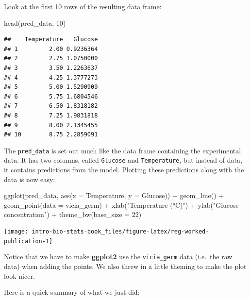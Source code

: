 \documentclass[
]{book}
\newenvironment{Shaded}{\begin{snugshade}}{\end{snugshade}}
\newcommand{\AttributeTok}[1]{\textcolor[rgb]{0.77,0.63,0.00}{#1}}
\newcommand{\DecValTok}[1]{\textcolor[rgb]{0.00,0.00,0.81}{#1}}
\newcommand{\FunctionTok}[1]{\textcolor[rgb]{0.00,0.00,0.00}{#1}}
\newcommand{\NormalTok}[1]{#1}
\newcommand{\SpecialCharTok}[1]{\textcolor[rgb]{0.00,0.00,0.00}{#1}}
\newcommand{\StringTok}[1]{\textcolor[rgb]{0.31,0.60,0.02}{#1}}
\begin{document}
Look at the first 10 rows of the resulting data frame:

\begin{Shaded}
\begin{Highlighting}[]
\FunctionTok{head}\NormalTok{(pred\_data, }\DecValTok{10}\NormalTok{)}
\end{Highlighting}
\end{Shaded}

\begin{verbatim}
##    Temperature   Glucose
## 1         2.00 0.9236364
## 2         2.75 1.0750000
## 3         3.50 1.2263637
## 4         4.25 1.3777273
## 5         5.00 1.5290909
## 6         5.75 1.6804546
## 7         6.50 1.8318182
## 8         7.25 1.9831818
## 9         8.00 2.1345455
## 10        8.75 2.2859091
\end{verbatim}

The \texttt{pred\_data} is set out much like the data frame containing the experimental data. It has two columns, called \texttt{Glucose} and \texttt{Temperature}, but instead of data, it contains predictions from the model. Plotting these predictions along with the data is now easy:

\begin{Shaded}
\begin{Highlighting}[]
\FunctionTok{ggplot}\NormalTok{(pred\_data, }\FunctionTok{aes}\NormalTok{(}\AttributeTok{x =}\NormalTok{ Temperature, }\AttributeTok{y =}\NormalTok{ Glucose)) }\SpecialCharTok{+} 
  \FunctionTok{geom\_line}\NormalTok{() }\SpecialCharTok{+} \FunctionTok{geom\_point}\NormalTok{(}\AttributeTok{data =}\NormalTok{ vicia\_germ) }\SpecialCharTok{+} 
  \FunctionTok{xlab}\NormalTok{(}\StringTok{"Temperature (°C)"}\NormalTok{) }\SpecialCharTok{+} \FunctionTok{ylab}\NormalTok{(}\StringTok{"Glucose concentration"}\NormalTok{) }\SpecialCharTok{+} 
  \FunctionTok{theme\_bw}\NormalTok{(}\AttributeTok{base\_size =} \DecValTok{22}\NormalTok{)}
\end{Highlighting}
\end{Shaded}

\begin{center}\texttt{[image: intro-bio-stats-book\_files/figure-latex/reg-worked-publication-1]} \end{center}

Notice that we have to make \textbf{ggplot2} use the \texttt{vicia\_germ} data (i.e.~the raw data) when adding the points. We also threw in a little theming to make the plot look nicer.

Here is a quick summary of what we just did:
\end{document}
